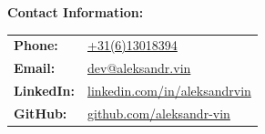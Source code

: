 \documentclass[letterpaper, 11pt]{article}
\begin{document}
\noindent
\textbf{Contact Information:}

\vspace{1em}

\begin{tabular}{ll}
  \textbf{Phone:} & \href{tel:+31613018394}{\url{+31(6)13018394}} \\
  \textbf{Email:} & \href{mailto:dev@aleksandr.vin}{\url{dev@aleksandr.vin}} \\
  \textbf{LinkedIn:} & \href{https://linkedin.com/in/aleksandrvin}{\url{linkedin.com/in/aleksandrvin}} \\
  \textbf{GitHub:} & \href{https://github.com/aleksandr-vin}{\url{github.com/aleksandr-vin}}
\end{tabular}
\end{document}
